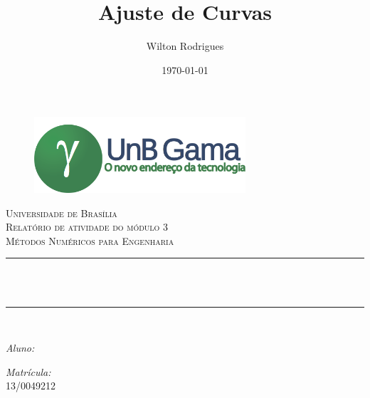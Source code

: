 \documentclass[12pt, hidelinks]{article}
\title{Ajuste de Curvas}								%
\author{Wilton Rodrigues}								%
\date{\today}											%
\makeatletter
\let\thetitle\@title
\let\theauthor\@author
\let\thedate\@date
\makeatother
\begin{document}

\begin{titlepage}
  \centering
  \begin{figure}[H]
    \centering
    \includegraphics[width=0.7\textwidth]{figuras/logo.png}\\[2.0 cm]
  \end{figure}
  \textsc{\LARGE Universidade de Brasília}\\[2.5 cm]	%
  \textsc{\Large Relatório de atividade do módulo 3}\\[0.5 cm]				%
  \textsc{\large Métodos Numéricos para Engenharia}\\[1.5 cm]				%
  \rule{\linewidth}{0.2 mm} \\[0.4 cm]
  {\huge \bfseries \thetitle}\\
  \rule{\linewidth}{0.2 mm} \\[2.5 cm]

  \begin{minipage}{0.4\textwidth}
    \begin{flushleft} \large
      \emph{Aluno:}\\
      \theauthor
    \end{flushleft}
  \end{minipage}
  \begin{minipage}{0.4\textwidth}
    \begin{flushright} \large
      \emph{Matrícula:} \\
      13/0049212									%
    \end{flushright}
  \end{minipage}\\
  \vspace*{0.5in}
  {\large \thedate}\\[0.5 cm]

  \vfill

\end{titlepage}

\end{document}
